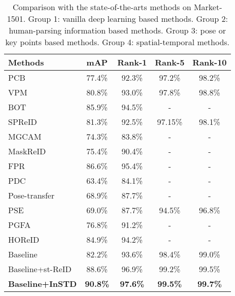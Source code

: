 \documentclass[10pt,twocolumn,letterpaper]{article}
\begin{document}
\begin{table}[t]
\begin{center}
\setlength{\tabcolsep}{1mm}
{
\begin{tabular}{l | c | c | c | c}
\hline
\bf{Methods} & \bf{mAP} & \bf{Rank-1} & \bf{Rank-5} & \bf{Rank-10}  \\
\hline
PCB~\cite{2017Beyond} & 77.4\% & 92.3\% & 97.2\% & 98.2\% \\
VPM~\cite{Perceive2020Perceive} & 80.8\% & 93.0\% & 97.8\% & 98.8\% \\
BOT~\cite{Luo2019Bag} & 85.9\% & 94.5\% & - & - \\


\hline
SPReID~\cite{Kalayeh2018Human} & 81.3\% & 92.5\% & 97.15\% & 98.1\% \\ 
MGCAM~\cite{Song2018Mask} & 74.3\% & 83.8\% & - & - \\
MaskReID~\cite{2018MaskReID} &75.4\% & 90.4\% & - & - \\
FPR~\cite{2020Foreground} & 86.6\% & 95.4\% & - & - \\

\hline
PDC~\cite{Su2017Learning} & 63.4\% & 84.1\% & - & - \\
Pose-transfer~\cite{2018Pose} & 68.9\% & 87.7\% & - & - \\
PSE~\cite{2017A} & 69.0\% & 87.7\% & 94.5\% & 96.8\% \\
PGFA~\cite{2019Pose} & 76.8\% & 91.2\% & - & - \\
HOReID~\cite{Wang2020High} & 84.9\% & 94.2\% & - & - \\

\hline
Baseline & 82.2\% & 93.6\% & 98.4\% & 99.0\% \\
Baseline+st-ReID~\cite{guangcong2019aaai} & 88.6\% & 96.9\% & 99.2\% & 99.5\% \\



\textbf{Baseline+InSTD} & \bf{90.8\%} & \bf{97.6\%}  & \bf{99.5\%} & \bf{99.7\%} \\
\hline
\end{tabular}}
\end{center}
\caption{Comparison with the state-of-the-arts methods on Market-1501. Group 1: vanilla deep learning based methods. Group 2: human-parsing information based methods. Group 3: pose or key points based methods. Group 4: spatial-temporal methods.}
\label{tab:market}
\vspace{-0.3cm}
\end{table}
\end{document}
